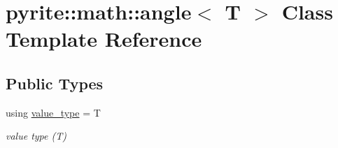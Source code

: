 \hypertarget{classpyrite_1_1math_1_1angle}{}\section{pyrite\+:\+:math\+:\+:angle$<$ T $>$ Class Template Reference}
\label{classpyrite_1_1math_1_1angle}
\subsection*{Public Types}
\begin{DoxyCompactItemize}
\item 
\mbox{\label{classpyrite_1_1math_1_1angle_addf4eff8f082fbbbd99babed3e19271f}} 
using \mbox{\hyperlink{classpyrite_1_1math_1_1angle_addf4eff8f082fbbbd99babed3e19271f}{value\+\_\+type}} = T
\begin{DoxyCompactList}\small\item\em value type (T) \end{DoxyCompactList}\end{DoxyCompactItemize}
